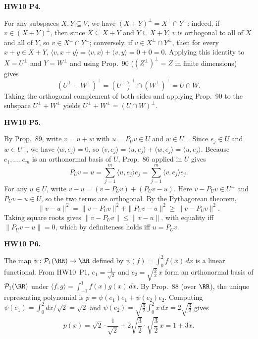 \documentclass[10pt]{scrartcl}
\newcommand{\ip}[2]{\langle #1,#2\rangle}
\begin{document}
\begin{prob}
\textbf{HW10 P4. }\par 
{}For any subspaces $X,Y\subseteq V$, we have $(X+Y)^\perp=X^\perp\cap Y^\perp$: indeed, if $v\in(X+Y)^\perp$, then since $X\subseteq X+Y$ and $Y\subseteq X+Y$, $v$ is orthogonal to all of $X$ and all of $Y$, so $v\in X^\perp\cap Y^\perp$; conversely, if $v\in X^\perp\cap Y^\perp$, then for every $x+y\in X+Y$, $\ip v{x+y}=\ip vx+\ip vy=0+0=0$. Applying this identity to $X=U^\perp$ and $Y=W^\perp$ and using Prop.~90 ($(Z^\perp)^\perp=Z$ in finite dimensions) gives
\[
  (U^\perp+W^\perp)^\perp = (U^\perp)^\perp \cap (W^\perp)^\perp = U \cap W.
\]
Taking the orthogonal complement of both sides and applying Prop.~90 to the subspace $U^\perp+W^\perp$ yields $U^\perp+W^\perp=(U\cap W)^\perp$.
\end{prob}

\begin{prob}
\textbf{HW10 P5. }\par 
\begin{enumerate}[(a)]
  \ii {}By Prop.~89, write $v=u+w$ with $u=P_U v\in U$ and $w\in U^\perp$. Since $e_j\in U$ and $w\in U^\perp$, we have $\ip w{e_j}=0$, so $\ip v{e_j}=\ip u{e_j}+\ip w{e_j}=\ip u{e_j}$. Because $e_1,\dots,e_m$ is an orthonormal basis of $U$, Prop.~86 applied in $U$ gives
  \[ P_U v=u=\sum_{j=1}^m\ip u{e_j}e_j=\sum_{j=1}^m\ip v{e_j}e_j. \]
  \ii {}For any $u\in U$, write $v-u=(v-P_U v)+(P_U v-u)$. Here $v-P_U v\in U^\perp$ and $P_U v-u\in U$, so the two terms are orthogonal. By the Pythagorean theorem,
  \[
    \|v-u\|^2 = \|v-P_U v\|^2 + \|P_U v-u\|^2 \ge \|v-P_U v\|^2.
  \]
  Taking square roots gives $\|v-P_U v\|\le\|v-u\|$, with equality iff $\|P_U v-u\|=0$, which by definiteness holds iff $u=P_U v$.
\end{enumerate}
\end{prob}

\begin{prob}
\textbf{HW10 P6. }\par 
{}The map $\psi\colon\PP_1(\RR)\to\RR$ defined by $\psi(f)=\int_0^2 f(x)\,dx$ is a linear functional. From HW10~P1, $e_1=\frac{1}{\sqrt 2}$ and $e_2=\sqrt{\frac{3}{2}}\,x$ form an orthonormal basis of $\PP_1(\RR)$ under $\ip fg=\int_{-1}^1 f(x)g(x)\,dx$. By Prop.~88 (over $\RR$), the unique representing polynomial is $p=\psi(e_1)e_1+\psi(e_2)e_2$. Computing $\psi(e_1)=\int_0^2 dx/\sqrt2=\sqrt{2}$ and $\psi(e_2)=\sqrt{\frac{3}{2}}\int_0^2 x\,dx=2\sqrt{\frac{3}{2}}$ gives
\[
  p(x) = \sqrt{2}\cdot\frac{1}{\sqrt 2} + 2\sqrt{\frac{3}{2}}\cdot\sqrt{\frac{3}{2}}\,x = 1 + 3x.
\]
\end{prob}
\end{document}

